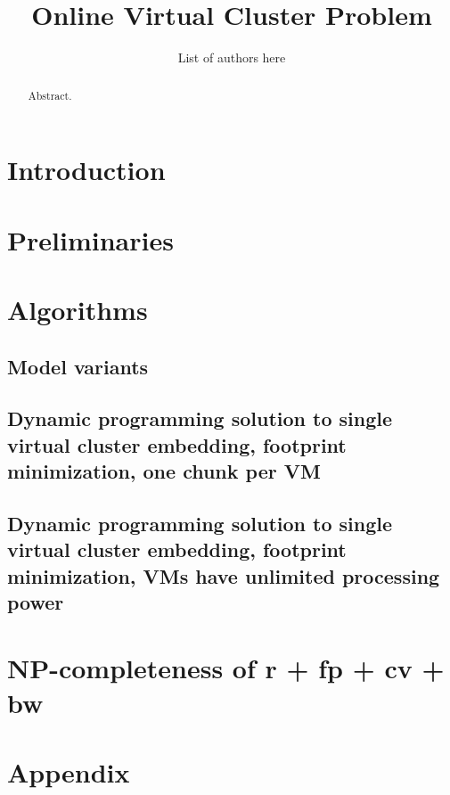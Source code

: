 \documentclass[11pt,a4paper]{scrartcl}
\title{Online Virtual Cluster Problem}
\author{List of authors here}
\begin{document}
\maketitle


\begin{abstract}
Abstract.
\end{abstract}

\section{Introduction}

\section{Preliminaries}


\section{Algorithms}

\subsection{Model variants}


\subsection{Dynamic programming solution to single virtual cluster
  embedding, footprint minimization, one chunk per VM}



\subsection{Dynamic programming solution to single virtual cluster
  embedding, footprint minimization, VMs have unlimited processing power}


\section{NP-completeness of r + fp + cv + bw}



\section{Appendix}



\end{document}
